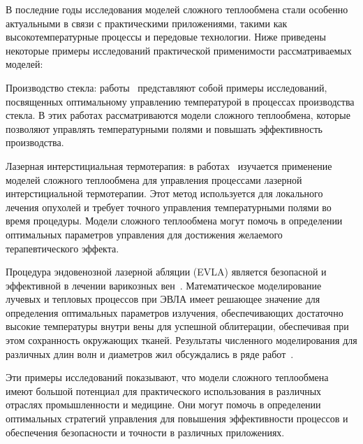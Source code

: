 В последние годы исследования моделей сложного теплообмена стали особенно
актуальными в связи с практическими приложениями, такими
как высокотемпературные процессы и передовые технологии.
Ниже приведены некоторые примеры исследований практической применимости рассматриваемых моделей:

Производство стекла: работы~\cite{frank2010optimal, clever2012optimal} представляют
собой примеры исследований, посвященных оптимальному
управлению температурой в процессах производства стекла.
В этих работах рассматриваются модели сложного теплообмена, которые позволяют управлять
температурными полями и повышать эффективность производства.

Лазерная интерстициальная термотерапия: в работах~\cite{Tse2012, Hubner2017}
изучается применение моделей сложного теплообмена для
управления процессами лазерной интерстициальной термотерапии.
Этот метод используется для локального лечения опухолей и
требует точного управления температурными полями во время процедуры.
Модели сложного теплообмена могут помочь в определении оптимальных
параметров управления для достижения желаемого терапевтического эффекта.

Процедура эндовенозной лазерной абляции (EVLA) является безопасной и эффективной
в лечении варикозных вен~\cite{Endovenous_vandenBos2009}.
Математическое моделирование лучевых и тепловых процессов при ЭВЛА
имеет решающее значение для определения оптимальных параметров
излучения, обеспечивающих достаточно высокие
температуры внутри вены для успешной облитерации,
обеспечивая при этом сохранность окружающих тканей.
Результаты численного моделирования для различных
длин волн и диаметров жил обсуждались в ряде работ~\cite{
    Opticalthermal_vanRuijven2014, Some_Poluektova2014,
    Endovenous_Malskat2014, Mathematical_Mordon2006,
}.


Эти примеры исследований показывают, что модели сложного теплообмена имеют
большой потенциал для практического использования в различных отраслях промышленности и медицине.
Они могут помочь в определении оптимальных стратегий
управления для повышения эффективности процессов
и обеспечения безопасности и точности в различных приложениях.

%


